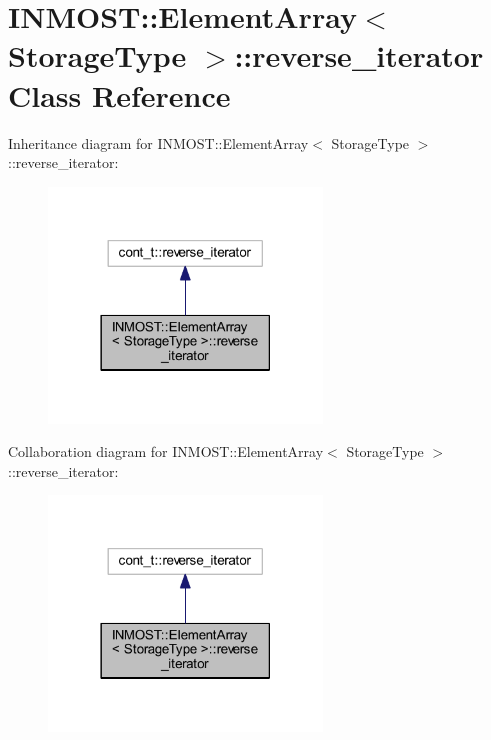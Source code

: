 \hypertarget{classINMOST_1_1ElementArray_1_1reverse__iterator}{\section{I\-N\-M\-O\-S\-T\-:\-:Element\-Array$<$ Storage\-Type $>$\-:\-:reverse\-\_\-iterator Class Reference}
\label{classINMOST_1_1ElementArray_1_1reverse__iterator}
}


Inheritance diagram for I\-N\-M\-O\-S\-T\-:\-:Element\-Array$<$ Storage\-Type $>$\-:\-:reverse\-\_\-iterator\-:\nopagebreak
\begin{figure}[H]
\begin{center}
\leavevmode
\includegraphics[width=206pt]{classINMOST_1_1ElementArray_1_1reverse__iterator__inherit__graph}
\end{center}
\end{figure}


Collaboration diagram for I\-N\-M\-O\-S\-T\-:\-:Element\-Array$<$ Storage\-Type $>$\-:\-:reverse\-\_\-iterator\-:\nopagebreak
\begin{figure}[H]
\begin{center}
\leavevmode
\includegraphics[width=206pt]{classINMOST_1_1ElementArray_1_1reverse__iterator__coll__graph}
\end{center}
\end{figure}
